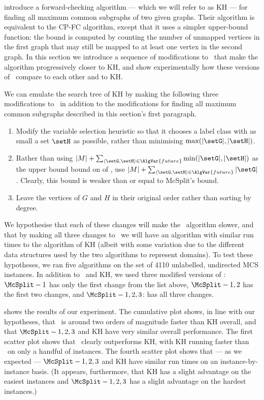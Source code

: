 \citet{DBLP:journals/spe/KrissinelH04} introduce a forward-checking
algorithm --- which we will refer to as KH --- for finding all maximum common subgraphs of two given graphs.  Their algorithm
is equivalent to the CP-FC algorithm, except that it uses a simpler upper-bound function:
the bound is computed by counting the number of unmapped vertices in the first graph that
may still be mapped to at least one vertex in the second graph.  In this section we
introduce a sequence of modifications to \McSplit\ that make the algorithm progressively
closer to KH, and show experimentally how these versions of \McSplit\ compare to each
other and to KH.

We can emulate the search tree of KH
by making the following three modifications to \McSplit\ in addition to the modifications for
finding all maximum common subgraphs described in this section's first paragraph.

\begin{enumerate}
    \item Modify the variable selection heuristic so that it chooses a label class with
as small a set $\setH$ as possible, rather than minimising $\max(|\setG|,|\setH|)$.
    \item Rather 
than using $|M|  + \sum_{\langle \setG,\setH \rangle \in \AlgVar{future}} \min(|\setG|,|\setH|)$
as the upper bound bound on  of ,
use $|M|  + \sum_{\langle \setG,\setH \rangle \in \AlgVar{future}} |\setG|$.  Clearly,
this bound is weaker than or equal to McSplit's bound.
    \item Leave the vertices of $G$ and $H$ in their original order rather than sorting
        by degree.
\end{enumerate}

We hypothesise that each of these changes will make the \McSplit\ algorithm slower, and that
by making all three changes to \McSplit\ we will have an algorithm with similar run times
to the algorithm of KH (albeit with some variation due to the different data structures
used by the two algorithms to represent domains).
To test these hypotheses, we ran five algorithms
on the set of 4110 unlabelled, undirected MCS instances.  In addition to \McSplit\ and
KH, we used three modified versions of \McSplit:
$\McSplit - 1$ has only the first change from the list above,
$\McSplit - 1,2$ has the first two changes, and
$\McSplit - 1,2,3$: has all three changes.

 shows the results of our experiment.  The cumulative plot shows,
in line with our hypotheses,
that \McSplit\ is around two orders of magnitude faster than KH overall, and that
$\McSplit - 1,2,3$ and KH have very similar overall performance.  The first scatter
plot shows that \McSplit\ clearly outperforms KH, with KH running faster than \McSplit\
on only a handful of instances.  The fourth scatter plot shows that --- as we expected ---
$\McSplit - 1,2,3$ and KH have similar run times on an instance-by-instance basis.
(It appears, furthermore, that
KH has a slight advantage on the easiest instances and
$\McSplit - 1,2,3$ has a slight advantage on the hardest instances.)

